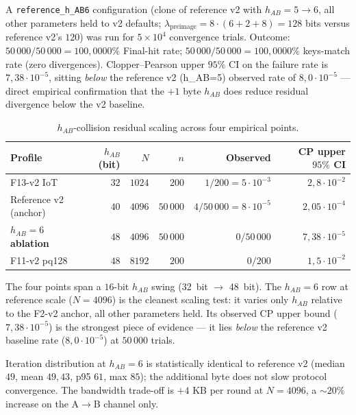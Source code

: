 \documentclass[11pt,a4paper]{article}
\begin{document}
A \texttt{reference\_h\_AB6} configuration (clone of reference v2 with $h_{AB} = 5 \to 6$, all other parameters held to v2 defaults; $\lambda_\text{preimage} = 8 \cdot (6+2+8) = 128$ bits versus reference v2's $120$) was run for $5 \times 10^4$ convergence trials. Outcome: $50\,000 / 50\,000 = 100{,}0000\%$ Final-hit rate; $50\,000 / 50\,000 = 100{,}0000\%$ keys-match rate (zero divergences). Clopper--Pearson upper $95\%$ CI on the failure rate is $7{,}38 \cdot 10^{-5}$, sitting \emph{below} the reference v2 (h_{AB}=5) observed rate of $8{,}0 \cdot 10^{-5}$ — direct empirical confirmation that the $+1$ byte $h_{AB}$ does reduce residual divergence below the v2 baseline.

\begin{table}[ht]
\centering
\small
\caption{$h_{AB}$-collision residual scaling across four empirical points.}
\label{tab:hab-scaling}
\begin{tabular}{lrrrrr}
\toprule
\textbf{Profile} & \textbf{$h_{AB}$ (bit)} & \textbf{$N$} & \textbf{$n$} & \textbf{Observed} & \textbf{CP upper $95\%$ CI} \\
\midrule
F13-v2 IoT             & $32$ & $1024$ & $200$    & $1/200 = 5 \cdot 10^{-3}$ & $2{,}8 \cdot 10^{-2}$ \\
Reference v2 (anchor)  & $40$ & $4096$ & $50\,000$ & $4/50\,000 = 8 \cdot 10^{-5}$ & $2{,}05 \cdot 10^{-4}$ \\
\textbf{$h_{AB} = 6$ ablation} & \textbf{$48$} & \textbf{$4096$} & \textbf{$50\,000$} & \textbf{$0/50\,000$}  & \textbf{$7{,}38 \cdot 10^{-5}$} \\
F11-v2 pq128           & $48$ & $8192$ & $200$    & $0/200$                  & $1{,}5 \cdot 10^{-2}$ \\
\bottomrule
\end{tabular}
\end{table}

The four points span a $16$-bit $h_{AB}$ swing (32~bit $\to$ 48~bit). The $h_{AB} = 6$ row at reference scale ($N = 4096$) is the cleanest scaling test: it varies only $h_{AB}$ relative to the F2-v2 anchor, all other parameters held. Its observed CP upper bound ($7{,}38 \cdot 10^{-5}$) is the strongest piece of evidence — it lies \emph{below} the reference v2 baseline rate ($8{,}0 \cdot 10^{-5}$) at $50\,000$ trials.

Iteration distribution at $h_{AB} = 6$ is statistically identical to reference v2 (median $49$, mean $49{,}43$, p95 $61$, max $85$); the additional byte does not slow protocol convergence. The bandwidth trade-off is $+4$ KB per round at $N = 4096$, a $\sim 20\%$ increase on the A$\to$B channel only.
\end{document}
